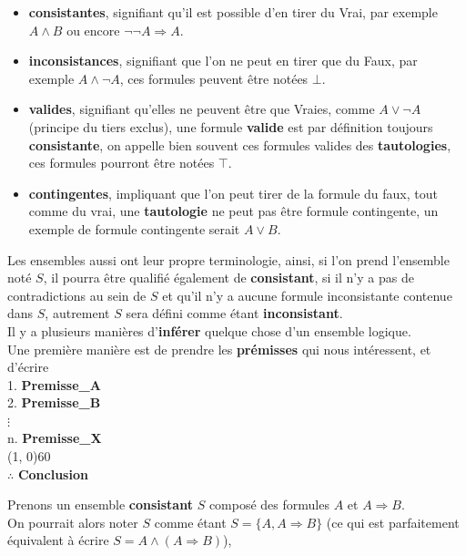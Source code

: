\documentclass[a4paper, 12pt]{article}
\newcommand{\imply}{\Rightarrow}
\numberwithin{equation}{subsection}
\begin{document}
  \begin{itemize}
  \item {\bf consistantes}, signifiant qu'il est possible d'en tirer du Vrai, par exemple $A \land B$ ou encore $\neg \neg A \imply A$.
  \item {\bf inconsistances}, signifiant que l'on ne peut en tirer que du Faux, par exemple $A \land \neg A$, ces formules peuvent être notées $\bot$.
  \item {\bf valides}, signifiant qu'elles ne peuvent être que Vraies, comme $A \lor \neg A$ (principe du tiers exclus), une formule {\bf valide} est par définition toujours {\bf consistante}, on appelle bien souvent ces formules valides des {\bf tautologies}, ces formules pourront être notées $\top$. \\
  \item {\bf contingentes}, impliquant que l'on peut tirer de la formule du faux, tout comme du vrai, une {\bf tautologie} ne peut pas être formule contingente,
  un exemple de formule contingente serait $A \lor B$.
  \end{itemize}

  Les ensembles aussi ont leur propre terminologie, ainsi, si l'on prend l'ensemble noté $S$, il pourra être qualifié également de {\bf consistant}, si il n'y a pas de contradictions au sein de $S$ et qu'il n'y a aucune formule inconsistante contenue dans $S$, autrement $S$ sera défini comme étant {\bf inconsistant}. \\[0.5cm]
  Il y a plusieurs manières d'{\bf inférer} quelque chose d'un ensemble logique. \\

  Une première manière est de prendre les {\bf prémisses} qui nous intéressent, et d'écrire \\[0.5cm]
    1. {\bf Premisse\_A} \\
    2. {\bf Premisse\_B} \\
    \hspace{0.2cm}$\vdots$ \\
    n. {\bf Premisse\_X} \\
    \hspace{0.5cm}\line(1, 0){60} \\
    $\therefore$ {\bf Conclusion} \

    Prenons un ensemble {\bf consistant} $S$ composé des formules $A$ et $A \imply B$. \\

    On pourrait alors noter $S$ comme étant $S = \{ A, A \imply B \}$ (ce qui est parfaitement équivalent à écrire $S = A \land (A \imply B)$), \\
\end{document}
